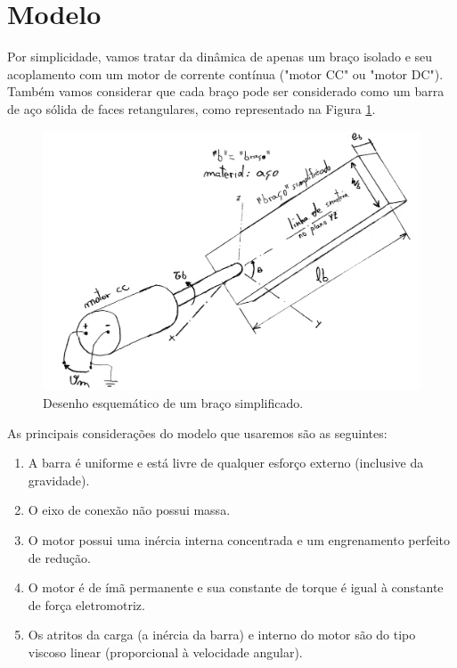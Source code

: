 \documentclass[12pt,a4paper,english,brazil]{article}
\begin{document}
\section{Modelo}\label{sec-modelo}

Por simplicidade, vamos tratar da dinâmica de apenas um braço isolado e seu acoplamento com um motor de corrente contínua ("motor CC" ou "motor DC"). Também vamos considerar que cada braço pode ser considerado como um barra de aço sólida de faces retangulares, como representado na Figura \ref{fig:motorEBraco}. \

\begin{figure}[H]
\centering
\includegraphics[width=1\textwidth]{motorEBraco.png}
\caption{\label{fig:motorEBraco} Desenho esquemático de um braço simplificado.}
\end{figure}

As principais considerações do modelo que usaremos são as seguintes:

\begin{enumerate}
    \item A barra é uniforme e está livre de qualquer esforço externo (inclusive da gravidade).
    \item O eixo de conexão não possui massa.
    \item O motor possui uma inércia interna concentrada e um engrenamento perfeito de redução. 
    \item O motor é de ímã permanente e sua constante de torque é igual à constante de força eletromotriz. 
    \item Os atritos da carga (a inércia da barra) e interno do motor são do tipo viscoso linear (proporcional à velocidade angular).
\end{enumerate}
\end{document}
